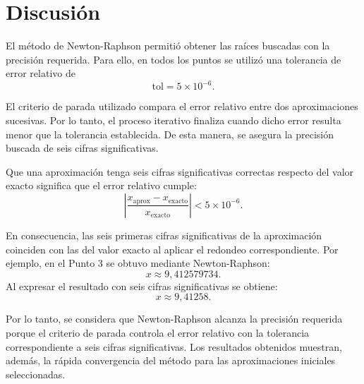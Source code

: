 
\chapter{Discusión}
El método de Newton-Raphson permitió obtener las raíces buscadas con la precisión requerida. Para ello, en todos los puntos se utilizó una tolerancia de error relativo de
\[
\text{tol} = 5 \times 10^{-6}.
\]

El criterio de parada utilizado compara el error relativo entre dos aproximaciones sucesivas. Por lo tanto, el proceso iterativo finaliza cuando dicho error resulta menor que la tolerancia establecida. De esta manera, se asegura la precisión buscada de seis cifras significativas.

Que una aproximación tenga seis cifras significativas correctas respecto del valor exacto significa que el error relativo cumple:
\[
\left|
\frac{x_{\mathrm{aprox}}-x_{\mathrm{exacto}}}
{x_{\mathrm{exacto}}}
\right|
< 5 \times 10^{-6}.
\]

En consecuencia, las seis primeras cifras significativas de la aproximación coinciden con las del valor exacto al aplicar el redondeo correspondiente. Por ejemplo, en el Punto 3 se obtuvo mediante Newton-Raphson:
\[
x \approx 9{,}412579734.
\]
Al expresar el resultado con seis cifras significativas se obtiene:
\[
x \approx 9{,}41258.
\]

Por lo tanto, se considera que Newton-Raphson alcanza la precisión requerida porque el criterio de parada controla el error relativo con la tolerancia correspondiente a seis cifras significativas. Los resultados obtenidos muestran, además, la rápida convergencia del método para las aproximaciones iniciales seleccionadas.